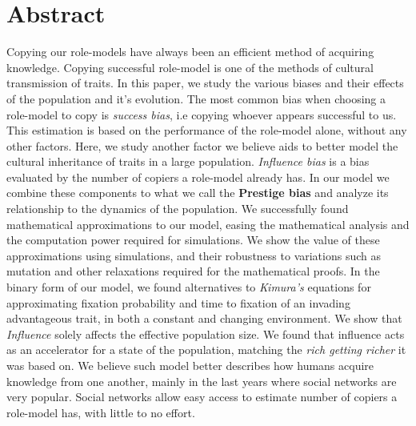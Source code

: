 \documentclass[11pt]{article}
\begin{document}
\section{Abstract}
Copying our role-models have always been an efficient method of acquiring knowledge. Copying successful role-model is one of the methods of cultural transmission of traits. In this paper, we study the various biases and their effects of the population and it's evolution. The most common bias when choosing a role-model to copy is \textit{success bias}, i.e copying whoever appears successful to us. This estimation is based on the performance of the role-model alone, without any other factors. Here, we study another factor we believe aids to better model the cultural inheritance of traits in a large population. \textit{Influence bias} is a bias evaluated by the number of copiers a role-model already has. In our model we combine these components to what we call the \textbf{Prestige bias} and analyze its relationship to the dynamics of the population. We successfully found mathematical approximations to our model, easing the mathematical analysis and the computation power required for simulations. We show the value of these approximations using simulations, and their robustness to variations such as mutation and other relaxations required for the mathematical proofs.
In the binary form of our model, we found alternatives to \textit{Kimura's} equations for approximating fixation probability and time to fixation of an invading advantageous trait, in both a constant and changing environment. We show that \textit{Influence} solely affects the effective population size.
We found that influence acts as an accelerator for a state of the population, matching the \textit{rich getting richer} it was based on.
We believe such model better describes how humans acquire knowledge from one another, mainly in the last years where social networks are very popular. Social networks allow easy access to estimate number of copiers a role-model has, with little to no effort.

\end{document}
